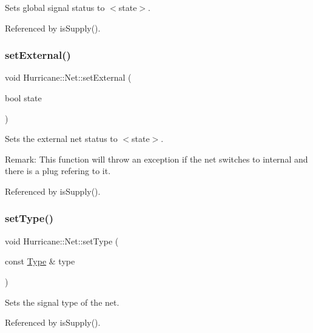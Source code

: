 Sets global signal status to {\ttfamily $<$state$>$}. 

Referenced by is\+Supply().

\mbox{\label{classHurricane_1_1Net_a6a30bc8282ce7e4b936e73a11549fedf}} 
\subsubsection{\texorpdfstring{set\+External()}{setExternal()}}
{\footnotesize\ttfamily void Hurricane\+::\+Net\+::set\+External (\begin{DoxyParamCaption}\item[{bool}]{state }\end{DoxyParamCaption})}

Sets the external net status to {\ttfamily $<$state$>$}.

\begin{DoxyParagraph}{Remark\+:}
This function will throw an exception if the net switches to internal and there is a plug refering to it. 
\end{DoxyParagraph}


Referenced by is\+Supply().

\mbox{\label{classHurricane_1_1Net_a83f5ce12291b0ec5ab584d515dd8963c}} 
\subsubsection{\texorpdfstring{set\+Type()}{setType()}}
{\footnotesize\ttfamily void Hurricane\+::\+Net\+::set\+Type (\begin{DoxyParamCaption}\item[{const \hyperlink{classHurricane_1_1Net_1_1Type}{Type} \&}]{type }\end{DoxyParamCaption})}

Sets the signal type of the net. 

Referenced by is\+Supply().

\mbox{\label{classHurricane_1_1Net_ac33d13bb0ddc60f369d5bfcffc4bb0f8}} 

